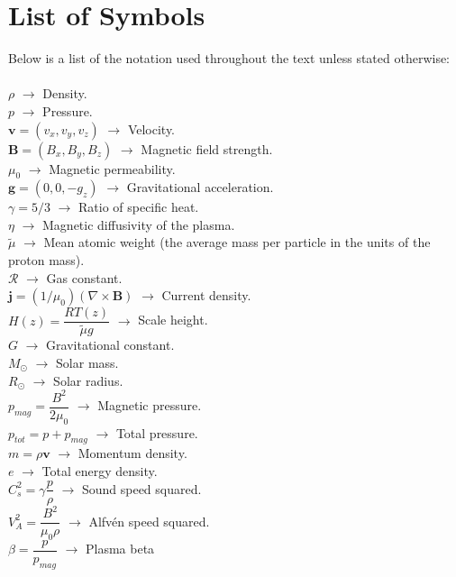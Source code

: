 \documentclass[12pt]{ociamthesis}
\newcommand{\rgas}{\mathcal{R}}
\newcommand{\Alfven}{Alfv\'{e}n }
\begin{document}

\baselineskip=18pt

\setcounter{secnumdepth}{3}
\setcounter{tocdepth}{3}

\section*{List of Symbols}
Below is a list of the notation used throughout the text unless stated otherwise: \\ \\
$\rho$ $\rightarrow$ Density.  \\
$p$ $\rightarrow$ Pressure. \\
$\boldsymbol{v} = (v_x, v_y, v_z)$ $\rightarrow$ Velocity.  \\
$\boldsymbol{B} = (B_x,B_y,B_z)$ $\rightarrow$ Magnetic field strength. \\
$\mu_0$ $\rightarrow$ Magnetic permeability. \\
$\boldsymbol{g} = (0,0,-g_z)$ $\rightarrow$ Gravitational acceleration. \\
$\gamma = 5/3$ $\rightarrow$ Ratio of specific heat. \\
$\eta$ $\rightarrow$ Magnetic diffusivity of the plasma. \\
$\widetilde{\mu}$ $\rightarrow$ Mean atomic weight (the average mass per particle in the units of the proton mass).  \\
$\rgas$ $\rightarrow$ Gas constant.\\
$\boldsymbol{j} = (1 / \mu_0) (\nabla \times \boldsymbol{B})$ $\rightarrow$ Current density.  \\
$H(z) = \dfrac{R T(z)}{\widetilde{\mu} g}$ $\rightarrow$ Scale height.  \\
$G$ $\rightarrow$ Gravitational constant. \\
$M_{\odot}$ $\rightarrow$ Solar mass. \\
$R_{\odot}$ $\rightarrow$ Solar radius. \\
$p_{mag} = \dfrac{B^2}{2 \mu_0} $ $\rightarrow$ Magnetic pressure. \\
$p_{tot} = p + p_{mag} $ $\rightarrow$ Total pressure. \\
$m = \rho \boldsymbol{v}$ $\rightarrow$ Momentum density. \\
$e$ $\rightarrow$ Total energy density. \\ 
$C^2_s = \gamma \dfrac{p}{\rho}$ $\rightarrow$ Sound speed squared. \\ 
$V_A^2=\dfrac{B^2}{\mu_0 \rho}$ $\rightarrow$ \Alfven speed squared.  \\
$\beta=\dfrac{p}{p_{mag}}$ $\rightarrow$ Plasma beta
\clearpage
\setcounter{page}{1}
\end{document}
